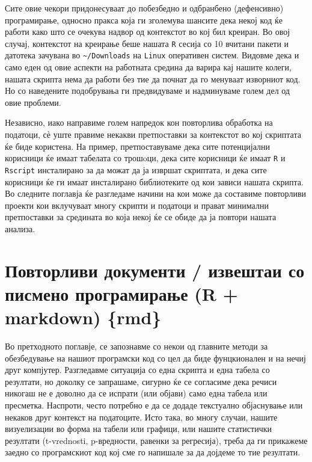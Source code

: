 \documentclass[
]{book}
\begin{document}
Сите овие чекори придонесуваат до побезбедно и одбранбено (дефенсивно) програмирање, односно пракса која ги зголемува шансите дека некој код ќе работи како што се очекува надвор од контекстот во кој бил креиран. Во овој случај, контекстот на креирање беше нашата \texttt{R} сесија со 10 вчитани пакети и датотека зачувана во \texttt{\textasciitilde{}/Downloads} на \texttt{Linux} оперативен систем. Видовме дека и само еден од овие аспекти на работната средина да варира кај нашите колеги, нашата скрипта нема да работи без тие да почнат да го менуваат изворниот код. Но со наведените подобрувања ги предвидуваме и надминуваме голем дел од овие проблеми.

Независно, иако направиме голем напредок кон повторлива обработка на податоци, сѐ уште правиме некакви претпоставки за контекстот во кој скриптата ќе биде користена. На пример, претпоставуваме дека сите потенцијални корисници ќе имаат табелата со трошoци, дека сите корисници ќе имаат \texttt{R} и \texttt{Rscript} инсталирано за да можат да ја извршат скриптата, и дека сите корисници ќе ги имаат инсталирано библиотеките од кои зависи нашата скрипта. Во следните поглавја ќе разгледаме начини на кои може да составиме повторливи проекти кои вклучуваат многу скрипти и податоци и прават минимални претпоставки за средината во која некој ќе се обиде да ја повтори нашата анализа.

\hypertarget{ux43fux43eux432ux442ux43eux440ux43bux438ux432ux438-ux434ux43eux43aux443ux43cux435ux43dux442ux438-ux438ux437ux432ux435ux448ux442ux430ux438-ux441ux43e-ux43fux438ux441ux43cux435ux43dux43e-ux43fux440ux43eux433ux440ux430ux43cux438ux440ux430ux45aux435-r-markdown-rmd}{%
\chapter{Повторливи документи / извештаи со писмено програмирање (R + markdown) \{rmd\}}\label{ux43fux43eux432ux442ux43eux440ux43bux438ux432ux438-ux434ux43eux43aux443ux43cux435ux43dux442ux438-ux438ux437ux432ux435ux448ux442ux430ux438-ux441ux43e-ux43fux438ux441ux43cux435ux43dux43e-ux43fux440ux43eux433ux440ux430ux43cux438ux440ux430ux45aux435-r-markdown-rmd}}

Во претходното поглавје, се запознавме со некои од главните методи за обезбедување на нашиот програмски код со цел да биде фунцкионален и на нечиј друг компјутер. Разгледавме ситуација со една скрипта и една табела со резултати, но доколку се запрашаме, сигурно ќе се согласиме дека речиси никогаш не е доволно да се испрати (или објави) само една табела или пресметка. Наспроти, често потребно е да се додаде текстуално објаснување или некаков друг контекст на податоците. Исто така, во многу случаи, нашите визуелизации во форма на табели или графици, или нашите статистички резултати (t-vrednosti, p-вредности, равенки за регресија), треба да ги прикажеме заедно со програмскиот код кој сме го напишале за да дојдеме то тие резултати.
\end{document}
